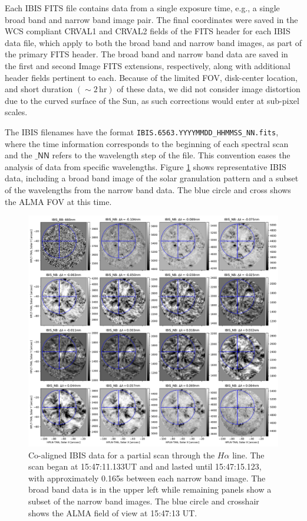 \documentclass[twocolumn]{aastex62}
\newcommand{\unit}[1]{\ensuremath{\, \mathrm{#1}}}
\newcommand{\figref}[1]{Figure \ref{#1}}
\newcommand{\code}[1]{\ensuremath{\textsf{#1}}}
\newcommand{\halpha}{\ensuremath{H\alpha}}
\begin{document}
Each IBIS FITS file contains data from a single exposure time, e.g., a single broad band and narrow band image pair.
The final coordinates were saved in the WCS compliant CRVAL1 and CRVAL2 fields of the FITS header for each IBIS data file, which apply to both the broad band and narrow band images, as part of the primary FITS header.
The broad band and narrow band data are saved in the first and second Image FITS extensions, respectively, along with additional header fields pertinent to each.
Because of the limited FOV, disk-center location, and short duration $(\sim 2\unit{hr})$ of these data, we did not consider image distortion due to the curved surface of the Sun, as such corrections would enter at sub-pixel scales.\par

The IBIS filenames have the format \texttt{IBIS.6563.YYYYMMDD\_HHMMSS\_NN.fits}, where the time information corresponds to the beginning of each spectral scan and the \code{\_NN} refers to the wavelength step of the file.
This convention eases the analysis of data from specific wavelengths.
\figref{fig:IBISgrid} shows representative IBIS data, including a broad band image of the solar granulation pattern and a subset of the wavelengths from the narrow band data.  The blue circle and cross shows the ALMA FOV at this time.

\begin{figure}
    \centering
    \includegraphics[width=7in]{./figures/IBIS_ALMAcirc_grid}
    \caption{Co-aligned IBIS data for a partial scan through the \halpha{} line.  The scan began at 15:47:11.133UT and and lasted until 15:47:15.123, with approximately 0.165s between each narrow band image. The broad band data is in the upper left while remaining panels show a subset of the narrow band images.  The blue circle and crosshair shows the ALMA field of view at 15:47:13 UT.}
    \label{fig:IBISgrid}
\end{figure}
\end{document}
